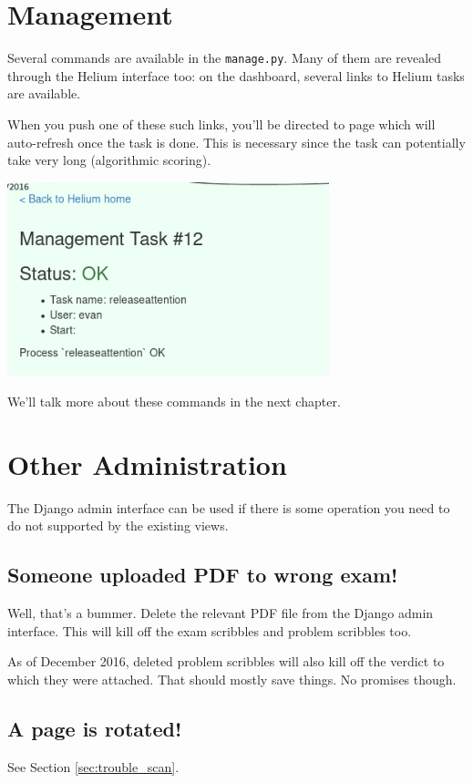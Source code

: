 \section{Management}
Several commands are available in the \texttt{manage.py}.
Many of them are revealed through the Helium interface too:
on the dashboard, several links to Helium tasks are available.

When you push one of these such links, you'll be directed to page
which will auto-refresh once the task is done.
This is necessary since the task can potentially take very long
(algorithmic scoring).
\begin{center}
	\includegraphics[width=0.7\textwidth]{images/viewtask.png}
\end{center}

We'll talk more about these commands in the next chapter.

\section{Other Administration}
The Django admin interface can be used if there
is some operation you need to do not supported by the existing views.

\subsection{Someone uploaded PDF to wrong exam!}
Well, that's a bummer.
Delete the relevant PDF file from the Django admin interface.
This will kill off the exam scribbles and problem scribbles too.

As of December 2016, deleted problem scribbles will also kill
off the verdict to which they were attached.
That should mostly save things. No promises though.

\subsection{A page is rotated!}
See Section \ref{sec:trouble_scan}.

